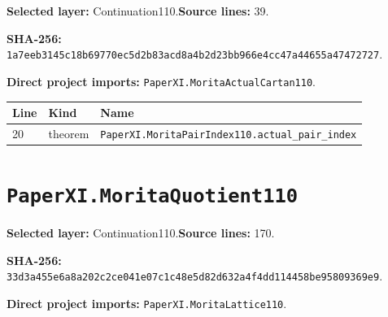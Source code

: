 \documentclass[10pt,oneside]{book}
\begin{document}
\textbf{Selected layer:} Continuation110.\quad\textbf{Source lines:} 39.\par\textbf{SHA-256:} {\scriptsize\nolinkurl{1a7eeb3145c18b69770ec5d2b83acd8a4b2d23bb966e4cc47a44655a47472727}}.


\textbf{Direct project imports:} \nolinkurl{PaperXI.MoritaActualCartan110}.

\begin{longtable}{@{}p{}p{}p{}@{}}\toprule Line&Kind&Name\\\midrule\endhead

20&theorem&\nolinkurl{PaperXI.MoritaPairIndex110.actual_pair_index}\\

\bottomrule\end{longtable}

\section{\texorpdfstring{\nolinkurl{PaperXI.MoritaQuotient110}}{PaperXI.MoritaQuotient110}}\label{module:PaperXI.MoritaQuotient110}

\textbf{Selected layer:} Continuation110.\quad\textbf{Source lines:} 170.\par\textbf{SHA-256:} {\scriptsize\nolinkurl{33d3a455e6a8a202c2ce041e07c1c48e5d82d632a4f4dd114458be95809369e9}}.


\textbf{Direct project imports:} \nolinkurl{PaperXI.MoritaLattice110}.
\end{document}
